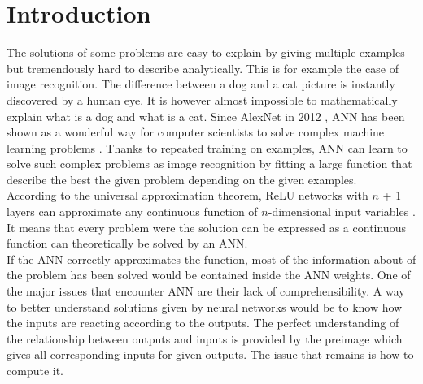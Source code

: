 \documentclass{article}
\begin{document}
\section{Introduction}
The solutions of some problems are easy to explain by giving multiple examples but tremendously hard to describe analytically. 
This is for example the case of image recognition. The difference between a dog and a cat picture is instantly discovered by a human eye. 
It is however almost impossible to mathematically explain what is a dog and what is a cat. Since AlexNet in 2012 \cite{krizhevsky2012imagenet}, 
ANN has been shown as a wonderful way for computer scientists to solve complex machine learning problems \cite{sejnowski2020unreasonable}. 
Thanks to repeated training on examples, ANN can learn to solve such complex problems as image recognition by fitting a large function 
that describe the best the given problem depending on the given examples.\\
According to the universal approximation theorem, ReLU networks with $n$ + 1 layers can approximate any continuous function of 
$n$-dimensional input variables \cite{hanin2017approximating}. It means that every problem were the solution can be expressed as a continuous function can 
theoretically be  solved by an ANN. \\
If the ANN correctly approximates the function, most of the information about of the problem has been solved would be contained 
inside the ANN weights. One of the major issues that encounter ANN are their lack of comprehensibility. 
A way to better understand solutions given by neural networks would be to know how the inputs are reacting according to the outputs. 
The perfect understanding of the relationship between outputs and inputs is provided by the preimage which gives all corresponding 
inputs for given outputs. The issue that remains is how to compute it. \\\\
\end{document}
